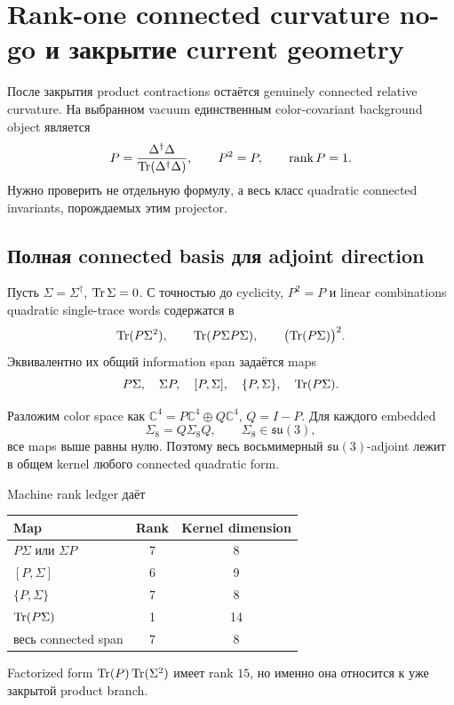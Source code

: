 \section{Rank-one connected curvature no-go и закрытие current geometry}

После закрытия product contractions остаётся genuinely connected
relative curvature. На выбранном vacuum единственным color-covariant
background object является
\begin{equation}
 P=\frac{\Delta^\dagger\Delta}
 {\operatorname{Tr}(\Delta^\dagger\Delta)},
 \qquad
 P^2=P,
 \qquad
 \operatorname{rank} P=1.
 \label{eq:ps-rank-one-color-projector}
\end{equation}
Нужно проверить не отдельную формулу, а весь класс quadratic connected
invariants, порождаемых этим projector.

\subsection{Полная connected basis для adjoint direction}

Пусть \(\Sigma=\Sigma^\dagger\), \(\operatorname{Tr}\Sigma=0\). С точностью до
cyclicity, \(P^2=P\) и linear combinations quadratic single-trace words
содержатся в
\begin{equation}
 \operatorname{Tr}(P\Sigma^2),
 \qquad
 \operatorname{Tr}(P\Sigma P\Sigma),
 \qquad
 \bigl(\operatorname{Tr}(P\Sigma)\bigr)^2.
 \label{eq:ps-connected-sigma-word-basis}
\end{equation}
Эквивалентно их общий information span задаётся maps
\begin{equation}
 P\Sigma,\quad
 \Sigma P,\quad
 [P,\Sigma],\quad
 \{P,\Sigma\},\quad
 \operatorname{Tr}(P\Sigma).
\end{equation}

Разложим color space как
\(\mathbb C^4=P\mathbb C^4\oplus Q\mathbb C^4\), \(Q=I-P\).
Для каждого embedded
\begin{equation}
 \Sigma_8=Q\Sigma_8Q,
 \qquad
 \Sigma_8\in\mathfrak{su}(3),
\end{equation}
все maps выше равны нулю. Поэтому весь восьмимерный
\(\mathfrak{su}(3)\)-adjoint лежит в общем kernel любого connected
quadratic form.

Machine rank ledger даёт
\begin{center}
\begin{tabular}{lcc}
\toprule
Map & Rank & Kernel dimension\\
\midrule
\(P\Sigma\) или \(\Sigma P\) & 7 & 8\\
\([P,\Sigma]\) & 6 & 9\\
\(\{P,\Sigma\}\) & 7 & 8\\
\(\operatorname{Tr}(P\Sigma)\) & 1 & 14\\
весь connected span & 7 & 8\\
\bottomrule
\end{tabular}
\end{center}
Factorized form
\(\operatorname{Tr}(P)\operatorname{Tr}(\Sigma^2)\) имеет rank \(15\), но именно она относится к
уже закрытой product branch.

